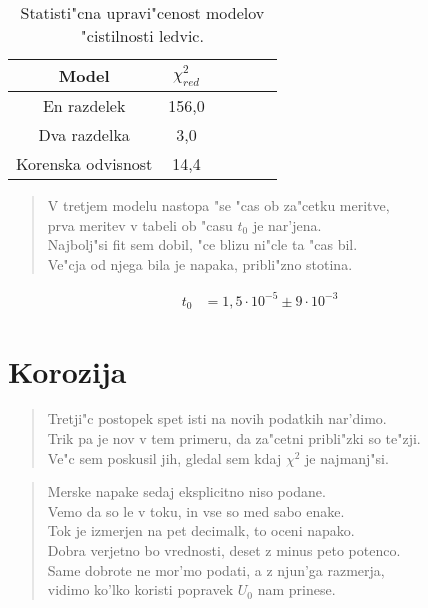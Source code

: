 \documentclass[a4paper,10pt]{article}
\begin{document}
\begin{table}[h]
 \centering
\begin{tabular}{|c|c|c|c|c|c|}
 \hline
  Model & $\chi^2_{red}$ \\
\hline
  En razdelek & 156,0 \\
  Dva razdelka & 3,0 \\
  Korenska odvisnost & 14,4 \\
\hline
\end{tabular}
\caption{Statisti"cna upravi"cenost modelov "cistilnosti ledvic. }
\label{tab:ledvice}
\end{table}

\begin{verse}
 V tretjem modelu nastopa "se "cas ob za"cetku meritve, \\
 prva meritev v tabeli ob "casu $t_0$ je nar'jena. \\
 Najbolj"si fit sem dobil, "ce blizu ni"cle ta "cas bil. \\
 Ve"cja od njega bila je napaka, pribli"zno stotina. 
\end{verse}

\begin{align}
 t_0 &= 1,5 \cdot 10^{-5} \pm 9 \cdot 10^{-3}
\end{align}


\section{Korozija}
\begin{verse}
 Tretji"c postopek spet isti na novih podatkih nar'dimo. \\
 Trik pa je nov v tem primeru, da za"cetni pribli"zki so te"zji. \\
 Ve"c sem poskusil jih, gledal sem kdaj $\chi^2$ je najmanj"si. \\
\end{verse}

\begin{verse}
  Merske napake sedaj eksplicitno niso podane. \\
  Vemo da so le v toku, in vse so med sabo enake. \\
  Tok je izmerjen na pet decimalk, to oceni napako. \\
  Dobra verjetno bo vrednosti, deset z minus peto potenco. \\
  Same dobrote ne mor'mo podati, a z njun'ga razmerja, \\
  vidimo ko'lko koristi popravek $U_0$ nam prinese. 
\end{verse}
\end{document}
